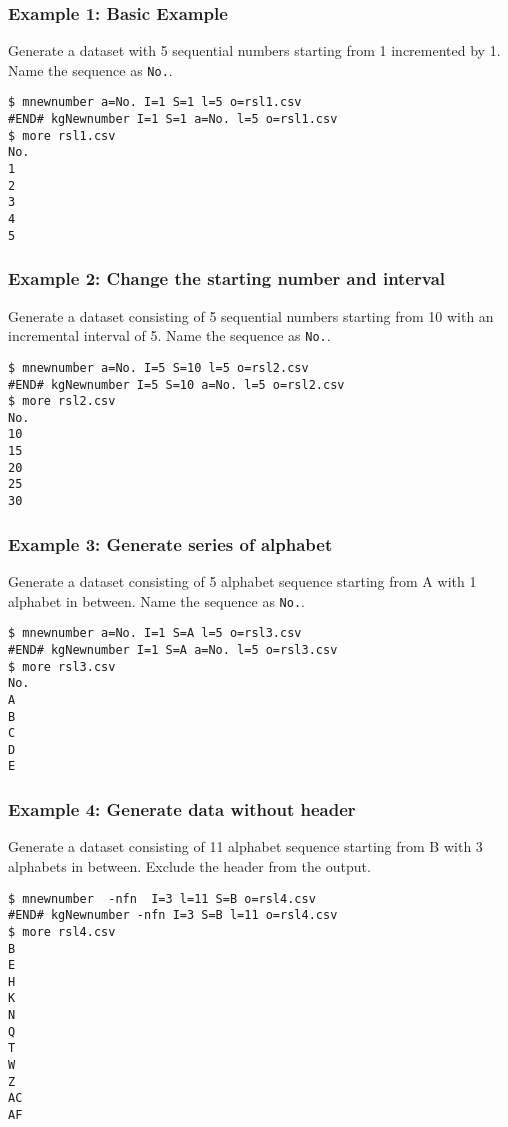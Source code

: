\subsubsection*{Example 1: Basic Example}

Generate a dataset with 5 sequential numbers starting from 1 incremented by 1. Name the sequence as \verb|No.|.


\begin{Verbatim}[baselinestretch=0.7,frame=single]
$ mnewnumber a=No. I=1 S=1 l=5 o=rsl1.csv
#END# kgNewnumber I=1 S=1 a=No. l=5 o=rsl1.csv
$ more rsl1.csv
No.
1
2
3
4
5
\end{Verbatim}
\subsubsection*{Example 2: Change the starting number and interval }

Generate a dataset consisting of 5 sequential numbers starting from 10 with an incremental interval of 5. Name the sequence as \verb|No.|.


\begin{Verbatim}[baselinestretch=0.7,frame=single]
$ mnewnumber a=No. I=5 S=10 l=5 o=rsl2.csv
#END# kgNewnumber I=5 S=10 a=No. l=5 o=rsl2.csv
$ more rsl2.csv
No.
10
15
20
25
30
\end{Verbatim}
\subsubsection*{Example 3: Generate series of alphabet}

Generate a dataset consisting of 5 alphabet sequence starting from A with 1 alphabet in between. Name the sequence as \verb|No.|.


\begin{Verbatim}[baselinestretch=0.7,frame=single]
$ mnewnumber a=No. I=1 S=A l=5 o=rsl3.csv
#END# kgNewnumber I=1 S=A a=No. l=5 o=rsl3.csv
$ more rsl3.csv
No.
A
B
C
D
E
\end{Verbatim}
\subsubsection*{Example 4: Generate data without header}

Generate a dataset consisting of 11 alphabet sequence starting from B with 3 alphabets in between. Exclude the header from the output.


\begin{Verbatim}[baselinestretch=0.7,frame=single]
$ mnewnumber  -nfn  I=3 l=11 S=B o=rsl4.csv
#END# kgNewnumber -nfn I=3 S=B l=11 o=rsl4.csv
$ more rsl4.csv
B
E
H
K
N
Q
T
W
Z
AC
AF
\end{Verbatim}
